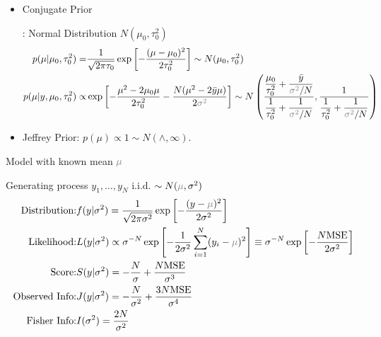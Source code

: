 \begin{itemize}[topsep=2pt,itemsep=0pt]
    \item \hypertarget{NormalWithVarConjugate}{Conjugate Prior}: Normal Distribution $ N(\mu _0,\tau_0^2) $
    \begin{align}
        p(\mu |\mu _0,\tau_0^2)=&\dfrac{ 1 }{ \sqrt{2\pi\tau_0} }\exp\left[ -\dfrac{ (\mu -\mu _0)^2 }{ 2\tau_0^2 }  \right]\sim N(\mu _0,\tau_0^2) \\
        p(\mu |y,\mu _0,\tau_0^2)\propto&\exp\left[ -\dfrac{ \mu ^2-2\mu _0\mu  }{ 2\tau_0^2 }-\dfrac{ N(\mu ^2-2\bar{y}\mu ) }{ 2\fixed{\sigma ^2} } \right]\sim N\left( \dfrac{ \dfrac{ \mu _0 }{ \tau_0^2 } + \dfrac{ \bar{y} }{ \fixed{\sigma ^2}/N }  }{ \dfrac{ 1 }{ \tau_0^2 } + \dfrac{ 1 }{ \fixed{\sigma ^2}/N } }  ,  \dfrac{ 1  }{ \dfrac{ 1 }{ \tau_0^2 } + \dfrac{ 1 }{ \fixed{\sigma ^2}/N } } \right)
    \end{align}

    \item Jeffrey Prior: $ p(\mu  )\propto 1\sim N(\wedge, \infty) $.
\end{itemize}



\begin{point}
    Model with known mean $ \fixed{\mu} $
\end{point}

Generating process $ y_1,\ldots,y_N $ i.i.d. $ \sim N(\fixed{\mu} ,\sigma ^2) $
\begin{align}
    \text{Distribution:}&f(y|\sigma ^2  )=\dfrac{1}{\sqrt{2\pi\sigma ^2}}\exp\left[ -\dfrac{(y-\fixed{\mu} )^2}{2\sigma ^2} \right]\\
    \text{Likelihood:}&L(y|\sigma ^2)\propto \sigma^{-N} \exp\left[ -\dfrac{1}{2\sigma ^2}\sum_{i=1}^N (y_i-\fixed{\mu})^2 \right]\equiv \sigma^{-N} \exp\left[ -\dfrac{N\mathrm{MSE}}{2\sigma ^2}   \right] \\
    \text{Score:}&S(y|\sigma ^2)= -\dfrac{N}{\sigma }+\dfrac{N\mathrm{MSE} }{\sigma ^3}\\
    \text{Observed Info:}&J(y|\sigma ^2)= -\dfrac{N}{\sigma ^2}+\dfrac{3N\mathrm{MSE} }{\sigma ^4}\\
    \text{Fisher Info:}&I(\sigma^2 )=\dfrac{2N}{\sigma ^2}
\end{align}

